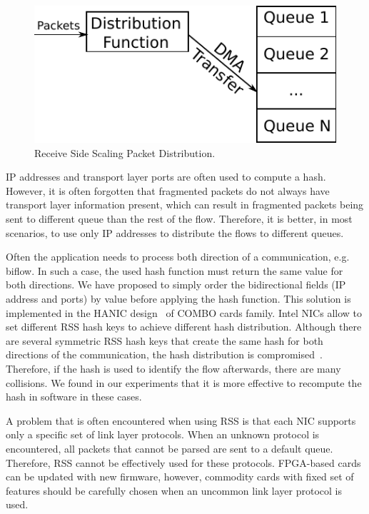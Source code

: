 \begin{figure}[t!]
  \begin{center}
    \includegraphics[width=\textwidth]{figures/rss}
  \end{center}
  \caption{Receive Side Scaling Packet Distribution.}
  \label{fig:rss}
\end{figure}

IP addresses and transport layer ports are often used to compute a hash. However, it is often forgotten that fragmented packets do not always have transport layer information present, which can result in fragmented packets being sent to different queue than the rest of the flow. Therefore, it is better, in most scenarios, to use only IP addresses to distribute the flows to different queues.

Often the application needs to process both direction of a communication, e.g. biflow. In such a case, the used hash function must return the same value for both directions. We have proposed to simply order the bidirectional fields (IP address and ports) by value before applying the hash function. This solution is implemented in the HANIC design~\cite{Liberouter--Hanic} of COMBO cards family. Intel NICs allow to set different RSS hash keys to achieve different hash distribution. Although there are several symmetric RSS hash keys that create the same hash for both directions of the communication, the hash distribution is compromised~\cite{Woo-2012-Scalable}. Therefore, if the hash is used to identify the flow afterwards, there are many collisions. We found in our experiments that it is more effective to recompute the hash in software in these cases.

A problem that is often encountered when using RSS is that each NIC supports only a specific set of link layer protocols. When an unknown protocol is encountered, all packets that cannot be parsed are sent to a default queue. Therefore, RSS cannot be effectively used for these protocols. FPGA-based cards can be updated with new firmware, however, commodity cards with fixed set of features should be carefully chosen when an uncommon link layer protocol is used.

